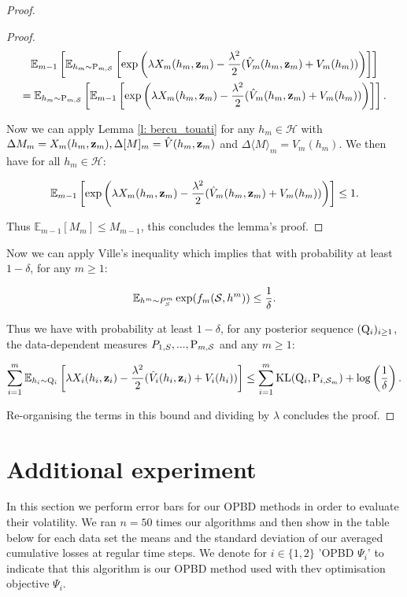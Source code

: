 \begin{noaddcontents}
\begin{proof}
\begin{proof}
   \begin{multline*}
     \mathbb{E}_{m-1}\left[ \mathbb{E}_{h_m\sim \P_{m,\S}}\left[\exp\left(\lambda X_m(h_m,\z_m)  - \frac{\lambda^2}{2}(\hat{V}_m(h_m,\z_m) + V_m(h_m))\right) \right]\right] \\ =  \mathbb{E}_{h_m\sim \P_{m,\S}}\left[\mathbb{E}_{m-1}\left[\exp\left(\lambda X_m(h_m,\z_m)  - \frac{\lambda^2}{2}(\hat{V}_m(h_m,\z_m) + V_m(h_m))\right) \right]\right].
   \end{multline*}

 Now we can apply Lemma \ref{l: bercu_touati} for any $h_m\in\mathcal{H}$ with $\Delta M_{m}=X_m(h_m,\z_m), \Delta[M]_{m}=\hat{V}(h_m,\z_m)$ and $\Delta\langle M\rangle_{m}= V_m(h_m)$. We then have for all $h_m\in\mathcal{H}$:

 \[ \mathbb{E}_{m-1}\left[\exp\left(\lambda X_m(h_m,\z_m)  - \frac{\lambda^2}{2}(\hat{V}_m(h_m,\z_m) + V_m(h_m))\right) \right] \leq 1.  \]

 Thus $\mathbb{E}_{m-1}[M_m] \leq M_{m-1}$, this concludes the lemma's proof.
   \end{proof}

 Now we can apply Ville's inequality which implies that with probability at least $1-\delta$, for any $m\geq 1$:

 \[ \mathbb{E}_{h^m\sim P^m_S}\exp(f_m(\S,h^m)) \leq \frac{1}{\delta}. \]

 Thus we have with probability at least $1-\delta$, for any posterior sequence $(\Q_{i})_{i\geq 1}$, the data-dependent measures $P_{1,S},...,\P_{m,\S}$ and any $m\geq 1$:

 \begin{align*}
  \sum_{i=1}^m \mathbb{E}_{h_i\sim \Q_{i}}\left[\lambda X_i(h_i,\z_i)  - \frac{\lambda^2}{2}(\hat{V}_i(h_i,\z_i) + V_i(h_i))\right] \leq \sum_{i=1}^m \operatorname{KL}(\Q_{i},\P_{i,\Sm}) + \log \left( \frac{1}{\delta}  \right).
 \end{align*}

 Re-organising the terms in this bound and dividing by $\lambda$ concludes the proof.

 \end{proof}


\section{Additional experiment}
\label{sec: error_bars}

In this section we perform error bars for our OPBD methods in order to evaluate their volatility.
We ran $n=50$ times our algorithms and then show in the table below for each data set the means and the standard deviation of our averaged cumulative losses at regular time steps. We denote for $i\in\{1,2\}$ 'OPBD $\Psi_i$' to indicate that this algorithm is our OPBD method used with thev optimisation objective $\Psi_i$.



\end{noaddcontents}
